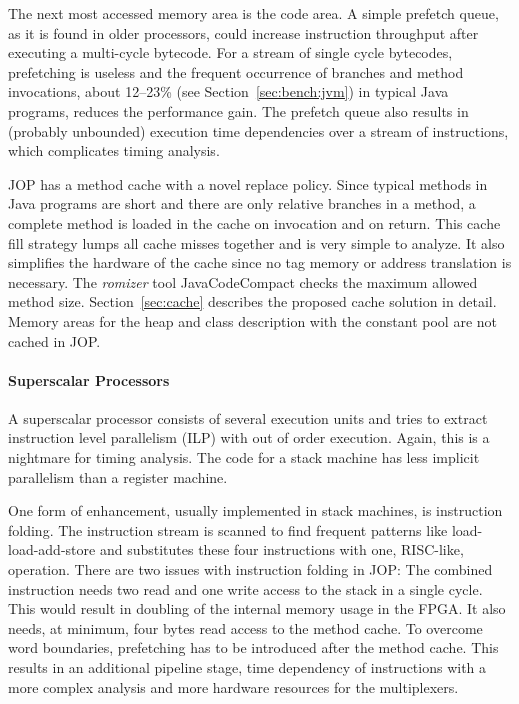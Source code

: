 The next most accessed memory area is the code area. A simple
prefetch queue, as it is found in older processors, could increase
instruction throughput after executing a multi-cycle bytecode. For a
stream of single cycle bytecodes, prefetching is useless and the
frequent occurrence of branches and method invocations, about
12--23\% (see Section~\ref{sec:bench:jvm}) in typical Java programs,
reduces the performance gain. The prefetch queue also results in
(probably unbounded) execution time dependencies over a stream of
instructions, which complicates timing analysis.

JOP has a method cache with a novel replace policy. Since typical
methods in Java programs are short and there are only relative
branches in a method, a complete method is loaded in the cache on
invocation and on return. This cache fill strategy lumps all cache
misses together and is very simple to analyze. It also simplifies
the hardware of the cache since no tag memory or address translation
is necessary. The \emph{romizer} tool JavaCodeCompact checks the
maximum allowed method size. Section~\ref{sec:cache} describes the
proposed cache solution in detail. Memory areas for the heap and
class description with the constant pool are not cached in JOP.

\paragraph{Superscalar Processors}

A superscalar processor consists of several execution units and
tries to extract instruction level parallelism (ILP) with out of
order execution. Again, this is a nightmare for timing analysis. The
code for a stack machine has less implicit parallelism than a
register machine.

One form of enhancement, usually implemented in stack machines, is
instruction folding. The instruction stream is scanned to find
frequent patterns like load-load-add-store and substitutes these
four instructions with one, RISC-like, operation. There are two
issues with instruction folding in JOP: The combined instruction
needs two read and one write access to the stack in a single cycle.
This would result in doubling of the internal memory usage in the
FPGA. It also needs, at minimum, four bytes read access to the
method cache. To overcome word boundaries, prefetching has to be
introduced after the method cache. This results in an additional
pipeline stage, time dependency of instructions with a more complex
analysis and more hardware resources for the multiplexers.

